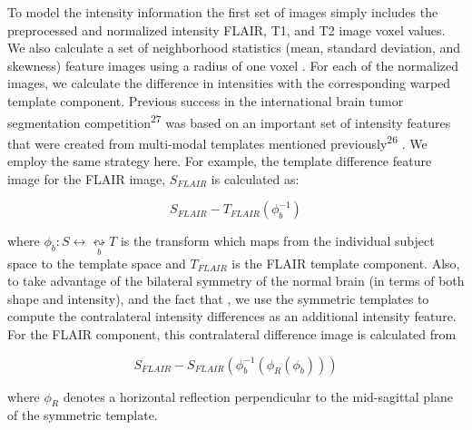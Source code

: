 \documentclass[11pt,]{article}
\begin{document}
To model the intensity information the first set of images simply
includes the preprocessed and normalized intensity FLAIR, T1, and T2
image voxel values. We also calculate a set of neighborhood statistics
(mean, standard deviation, and skewness) feature images using a
 radius of one voxel
. For each of the normalized images, we calculate the
difference in intensities with the corresponding warped template
component. Previous success in the international brain tumor
segmentation competition\textsuperscript{27} was based on an important
set of intensity features that were created from multi-modal templates
mentioned previously\textsuperscript{26}
. We employ the same strategy here.
For example, the template difference feature image for the FLAIR image,
\(S_{FLAIR}\) is calculated as:

\[S_{FLAIR} - T_{FLAIR}\left(\phi_b^{-1}\right)\]

where \(\phi_b: S \leftrightarrow \underset{b}{\leftrightsquigarrow} T\)
is the transform which maps from the individual subject space to the
template space and \(T_{FLAIR}\) is the FLAIR template component. Also,
to take advantage of the
bilateral symmetry of the normal brain (in terms of both shape and
intensity), and the fact that
,
we use the symmetric templates to compute the contralateral intensity
differences as an additional intensity feature. For the FLAIR component,
this contralateral difference image is calculated from

\[S_{FLAIR} - S_{FLAIR}\left(\phi_b^{-1}\left(\phi_R\left(\phi_b\right)\right)\right)\]

where \(\phi_R\) denotes a horizontal reflection perpendicular to the
mid-sagittal plane of the symmetric template.
\end{document}
